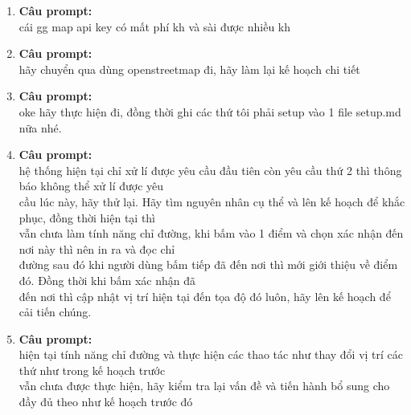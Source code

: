 \begin{enumerate}
\item \textbf{Câu prompt:} \\
\* cái gg map api key có mất phí kh và sài được nhiều kh \\



\item \textbf{Câu prompt:} \\
\* hãy chuyển qua dùng openstreetmap đi, hãy làm lại kế hoạch chi tiết \\



\item \textbf{Câu prompt:} \\
\* oke hãy thực hiện đi, đồng thời ghi các thứ tôi phải setup vào 1 file setup.md nữa nhé. \\



\item \textbf{Câu prompt:} \\
\* hệ thống hiện tại chỉ xử lí được yêu cầu đầu tiên còn yêu cầu thứ 2 thì thông báo không thể xử lí được yêu \\
       cầu lúc này, hãy thử lại. Hãy tìm nguyên nhân cụ thể và lên kế hoạch để khắc phục, đồng thời hiện tại thì \\
       vẫn chưa làm tính năng chỉ đường, khi bấm vào 1 điểm và chọn xác nhận đến nơi này thì nên in ra và đọc chỉ \\
       đường sau đó khi người dùng bấm tiếp đã đến nơi thì mới giới thiệu về điểm đó. Đồng thời khi bấm xác nhận đã \\
       đến nơi thì cập nhật vị trí hiện tại đến tọa độ đó luôn, hãy lên kế hoạch để cải tiến chúng. \\



\item \textbf{Câu prompt:} \\
\* hiện tại tính năng chỉ đường và thực hiện các thao tác như thay đổi vị trí các thứ như trong kế hoạch trước \\
       vẫn chưa được thực hiện, hãy kiểm tra lại vấn đề và tiến hành bổ sung cho đầy đủ theo như kế hoạch trước đó \\




\end{enumerate}
